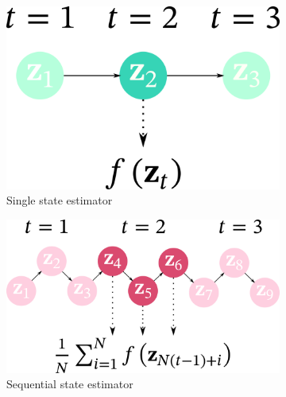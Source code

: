 \begin{figure}
  \vspace{-0.4in}
    \centering
    \begin{subfigure}[b]{0.25\textwidth}
        \centering
        \includegraphics[scale=0.25]{figures/diagram_1.png}
        \caption{Single state estimator}\label{fig:single}
    \end{subfigure}
    \begin{subfigure}[b]{0.35\textwidth}
        \centering
        \includegraphics[scale=0.25]{figures/diagram_2.png}
        \caption{Sequential state estimator}\label{fig:seq}
    \end{subfigure}
    \begin{subfigure}[b]{0.3\textwidth}
        \centering

\end{subfigure}
\end{figure}
